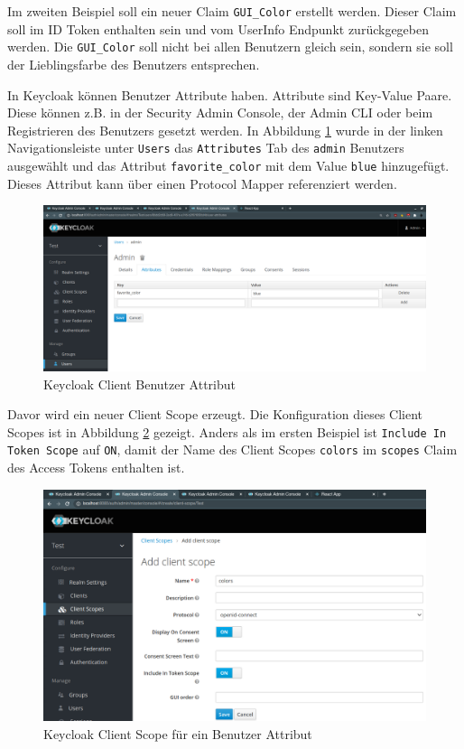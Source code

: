 Im zweiten Beispiel soll ein neuer Claim \texttt{GUI\_Color} erstellt werden. Dieser Claim soll im ID Token enthalten sein und vom UserInfo Endpunkt zurückgegeben werden. Die \texttt{GUI\_Color} soll nicht bei allen Benutzern gleich sein, sondern sie soll der Lieblingsfarbe des Benutzers entsprechen.

In Keycloak können Benutzer Attribute haben. Attribute sind Key-Value Paare. Diese können z.B. in der Security Admin Console, der Admin CLI oder beim Registrieren des Benutzers gesetzt werden. In Abbildung \ref{fig:EB_Keycloak Client User Attribut} wurde in der linken Navigationsleiste unter \texttt{Users} das \texttt{Attributes} Tab des \texttt{admin} Benutzers ausgewählt und das Attribut \texttt{favorite\_color} mit dem Value \texttt{blue} hinzugefügt. Dieses Attribut kann über einen Protocol Mapper referenziert werden.

\begin{figure}[!ht]
	\centering
	\includegraphics[width=1\textwidth]{Images/EbertScherer/KeycloakNewUserAttribute.PNG}
	\caption{Keycloak Client Benutzer Attribut}
	\label{fig:EB_Keycloak Client User Attribut}
\end{figure}

Davor wird ein neuer Client Scope erzeugt. Die Konfiguration dieses Client Scopes ist in Abbildung \ref{fig:EB_Keycloak Client Scope für User Attribut} gezeigt. Anders als im ersten Beispiel ist \texttt{Include In Token Scope} auf \texttt{ON}, damit der Name des Client Scopes \texttt{colors} im \texttt{scopes} Claim des Access Tokens enthalten ist.

\begin{figure}[!ht]
	\centering
	\includegraphics[width=1\textwidth]{Images/EbertScherer/KeycloakNewUserAttributeClientScope.PNG}
	\caption{Keycloak Client Scope für ein Benutzer Attribut}
	\label{fig:EB_Keycloak Client Scope für User Attribut}
\end{figure}

